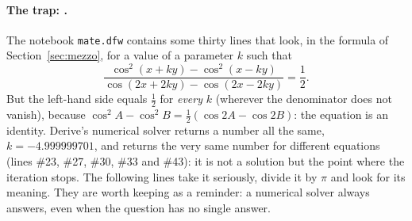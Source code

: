 \paragraph{The trap: .}
The notebook \texttt{mate.dfw} contains some thirty lines that look, in the
formula of Section~\ref{sec:mezzo}, for a value of a parameter $k$ such that
\[
  \frac{\cos^2(x+ky)-\cos^2(x-ky)}{\cos(2x+2ky)-\cos(2x-2ky)}=\frac12 .
\]
But the left-hand side equals $\tfrac12$ for \emph{every} $k$ (wherever the
denominator does not vanish), because $\cos^2 A-\cos^2 B=\tfrac12(\cos 2A-\cos
2B)$: the equation is an identity. Derive's numerical solver returns a number
all the same, $k=-4.999999701$, and returns the very same number for
different equations (lines \#23, \#27, \#30, \#33 and \#43): it is not a
solution but the point where the iteration stops. The following lines take it
seriously, divide it by $\pi$ and look for its meaning. They are worth
keeping as a reminder: a numerical solver always answers, even when the
question has no single answer.
